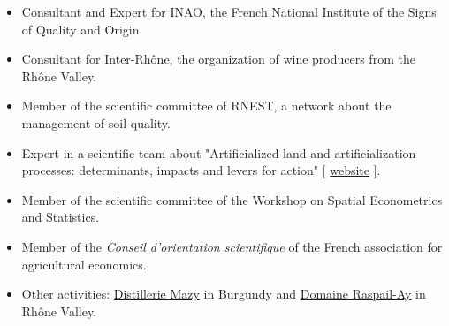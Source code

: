 \documentclass[11pt, a4paper]{./style}
\begin{document}
\begin{itemize}
\item Consultant and Expert for INAO, the French National Institute of
the Signs of Quality and Origin.
\item Consultant for Inter-Rhône, the organization of wine producers
from the Rhône Valley.
\item Member of the scientific committee of RNEST, a network about the
management of soil quality.
\item Expert in a scientific team about "Artificialized land and
artificialization processes: determinants, impacts and levers for
action" [ \href{https://www.inrae.fr/actualites/sols-artificialises-processus-dartificialisation-sols}{website} ].
\item Member of the scientific committee of the Workshop on Spatial
Econometrics and Statistics.
\item Member of the \emph{Conseil d'orientation scientifique} of the French
association for agricultural economics.
\item Other activities: \href{https://distillerie-mazy.fr/}{Distillerie Mazy} in Burgundy and \href{https://www.gigondas-vin.com/vigneron/domaine-raspail-ay/}{Domaine
Raspail-Ay} in Rhône Valley.
\end{itemize}
\end{document}
